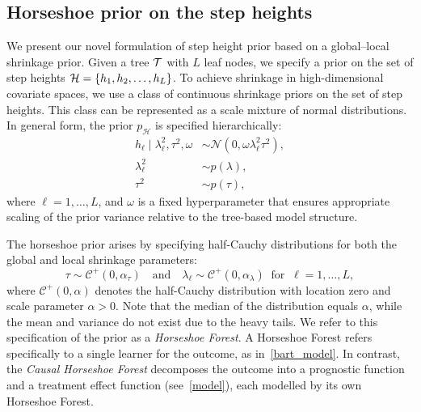\subsection{Horseshoe prior on the step heights}\label{stepheight_prior}

We present our novel formulation of step height prior based on a global--local shrinkage prior.
Given a tree $\mathcal{T}$ with $L$ leaf nodes, we specify a prior on the set of step heights $\mathcal{H} = \{h_1, h_2, \dots, h_L\}$.
To achieve shrinkage in high-dimensional covariate spaces, we use a class of continuous shrinkage priors on the set of step heights. 
This class can be represented as a scale mixture of normal distributions.
In general form, the prior $p_\mathcal{H}$ is specified hierarchically:
\begin{equation}
\begin{split}
h_\ell \mid \lambda_\ell^2, \tau^2,  \omega &\sim \mathcal{N}(0, \omega \lambda_\ell^2 \tau^2), \\
\lambda_\ell^2 &\sim p(\lambda), \\
\tau^2 &\sim p(\tau),
\end{split}
\end{equation}
where $\ell = 1, \ldots, L$, and $\omega$ is a fixed hyperparameter that ensures appropriate scaling of the prior variance relative to the tree-based model structure.

The horseshoe prior \citep{OriginalHorseshoe, PolsonScott2011} arises by specifying half-Cauchy distributions for both the global and local shrinkage parameters:
\begin{equation}\label{Horseshoe}
    \tau \sim \mathcal{C}^+(0, \alpha_\tau) \quad \text{and} \quad \lambda_\ell \sim \mathcal{C}^+(0, \alpha_\lambda) \ \text{ for } \ \ell = 1, \ldots, L,
\end{equation}
where $\mathcal{C}^+(0, \alpha)$ denotes the half-Cauchy distribution with location zero and scale parameter $\alpha > 0$.
Note that the median of the distribution equals $\alpha$, while the mean and variance do not exist due to the heavy tails.
We refer to this specification of the prior as a \textsl{Horseshoe Forest}.
A Horseshoe Forest refers specifically to a single learner for the outcome, as in~\eqref{bart_model}.
In contrast, the \textsl{Causal Horseshoe Forest} decomposes the outcome into a prognostic function and a treatment effect function (see~\eqref{model}), each modelled by its own Horseshoe Forest.

